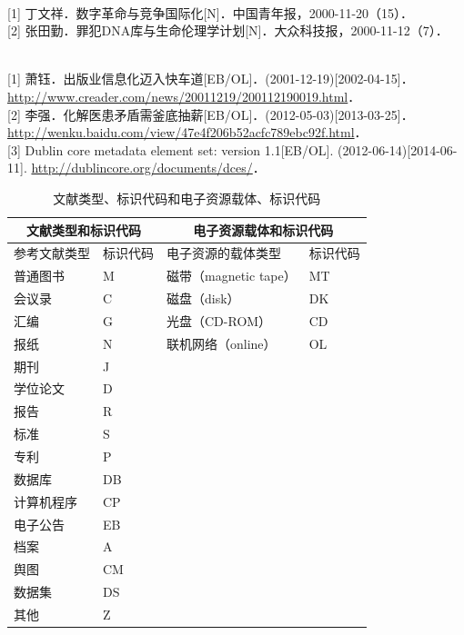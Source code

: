 \documentclass[UTF8,zihao=-4,twoside,openany]{ctexbook}
\begin{document}
{\vspace{0.4cm}
\\
{[1]} 丁文祥．数字革命与竞争国际化[N]．中国青年报，2000-11-20（15）．\\
{[2]} 张田勤．罪犯DNA库与生命伦理学计划[N]．大众科技报，2000-11-12（7）．

\vspace{0.4cm}
\\
{[1]} 萧钰．出版业信息化迈入快车道[EB/OL]．(2001-12-19)[2002-04-15]．\url{http://www.creader.com/news/20011219/200112190019.html}．\\
{[2]} 李强．化解医患矛盾需釜底抽薪[EB/OL]．(2012-05-03)[2013-03-25]．\url{http://wenku.baidu.com/view/47e4f206b52acfc789ebc92f.html}．\\
{[3]} Dublin core metadata element set: version 1.1[EB/OL]. (2012-06-14)[2014-06-11]. \url{http://dublincore.org/documents/dces/}．
}

\vspace{0.6cm}
\begin{table}[htbp]
  \centering
  \caption{文献类型、标识代码和电子资源载体、标识代码}
  \vspace{6pt}
  \fontsize{10.5pt}{14pt}\selectfont
  \begin{tabular}{|m{3.5cm}|m{2.5cm}|m{4.5cm}|m{2.5cm}|}
    \hline
    \multicolumn{2}{|c|}{\textbf{文献类型和标识代码}} & \multicolumn{2}{c|}{\textbf{电子资源载体和标识代码}} \\ \hline
    \centering 参考文献类型 & \centering 标识代码 & \centering 电子资源的载体类型 & \centering 标识代码 \tabularnewline \hline
    \centering 普通图书 & \centering M & \centering 磁带（magnetic tape） & \centering MT \tabularnewline \hline
    \centering 会议录 & \centering C & \centering 磁盘（disk） & \centering DK \tabularnewline \hline
    \centering 汇编 & \centering G & \centering 光盘（CD-ROM） & \centering CD \tabularnewline \hline
    \centering 报纸 & \centering N & \centering 联机网络（online） & \centering OL \tabularnewline \hline
    \centering 期刊 & \centering J & & \tabularnewline \hline
    \centering 学位论文 & \centering D & & \tabularnewline \hline
    \centering 报告 & \centering R & & \tabularnewline \hline
    \centering 标准 & \centering S & & \tabularnewline \hline
    \centering 专利 & \centering P & & \tabularnewline \hline
    \centering 数据库 & \centering DB & & \tabularnewline \hline
    \centering 计算机程序 & \centering CP & & \tabularnewline \hline
    \centering 电子公告 & \centering EB & & \tabularnewline \hline
    \centering 档案 & \centering A & & \tabularnewline \hline
    \centering 舆图 & \centering CM & & \tabularnewline \hline
    \centering 数据集 & \centering DS & & \tabularnewline \hline
    \centering 其他 & \centering Z & & \tabularnewline \hline
  \end{tabular}
\end{table}
\end{document}
